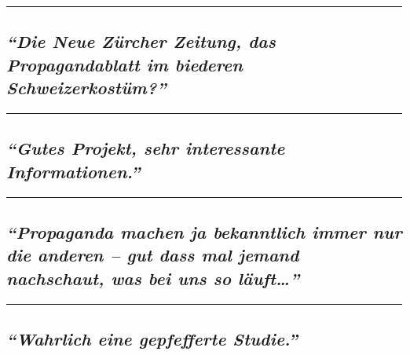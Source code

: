 \begin{center}\rule{0.5\linewidth}{\linethickness}\end{center}

\hypertarget{die-neue-zuxfcrcher-zeitung-das-propagandablatt-im-biederen-schweizerkostuxfcm}{%
\subsection{\texorpdfstring{\emph{``Die Neue Zürcher Zeitung, das
Propagandablatt im biederen
Schweizerkostüm?''}}{``Die Neue Zürcher Zeitung, das Propagandablatt im biederen Schweizerkostüm?''}}\label{die-neue-zuxfcrcher-zeitung-das-propagandablatt-im-biederen-schweizerkostuxfcm}}

\begin{center}\rule{0.5\linewidth}{\linethickness}\end{center}

\hypertarget{gutes-projekt-sehr-interessante-informationen}{%
\subsection{\texorpdfstring{\emph{``Gutes Projekt, sehr interessante
Informationen.''}}{``Gutes Projekt, sehr interessante Informationen.''}}\label{gutes-projekt-sehr-interessante-informationen}}

\begin{center}\rule{0.5\linewidth}{\linethickness}\end{center}

\hypertarget{-propaganda-machen-ja-bekanntlich-immer-nur-die-anderen--gut-dass-mal-jemand-nachschaut-was-bei-uns-so-luxe4uft}{%
\subsection{\texorpdfstring{ \emph{``Propaganda machen ja bekanntlich
immer nur die anderen -- gut dass mal jemand nachschaut, was bei uns so
läuft\ldots{}''}}{ ``Propaganda machen ja bekanntlich immer nur die anderen -- gut dass mal jemand nachschaut, was bei uns so läuft\ldots{}''}}\label{-propaganda-machen-ja-bekanntlich-immer-nur-die-anderen--gut-dass-mal-jemand-nachschaut-was-bei-uns-so-luxe4uft}}

\begin{center}\rule{0.5\linewidth}{\linethickness}\end{center}

\hypertarget{-wahrlich-eine-gepfefferte-studie}{%
\subsection{\texorpdfstring{ \emph{``Wahrlich eine gepfefferte
Studie.''}}{ ``Wahrlich eine gepfefferte Studie.''}}\label{-wahrlich-eine-gepfefferte-studie}}

